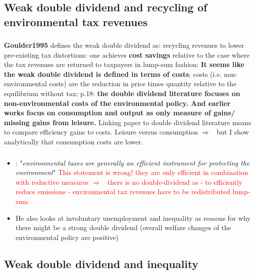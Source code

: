 \documentclass[12pt]{article}
\newcommand{\ar}{$\Rightarrow$ \ }
\newcommand{\tr}[1]{\textcolor{red}{#1}}
\begin{document}
\subsection{Weak double dividend and recycling of environmental tax revenues}
\subsubsection{\cite{Goulder1995EnvironmentalGuide}}
\textbf{Goulder1995} defines the weak double dividend as: recycling revenues to lower pre-existing tax distortions: one achieves \textbf{cost savings} relative to the case where the tax revenues are returned to taxpayers in lump-sum fashion; 
\textbf{It seems like the weak double dividend is defined in terms of costs}; costs (i.e. non-environmental costs) are the reduction in price times quantity relative to the equilibrium without tax; p.18: \textbf{the double dividend literature focuses on non-environmental costs of the environmental policy. And earlier works focus on consumption and output as only measure of gains/ missing gains from leisure. } 
Linking paper to double dividend literature means to compare efficiency gains to costs. Leisure versus consumption \ar but I show analytically that consumption costs are lower. 


\subsubsection{\cite{Fried2018TheGenerations}}
\subsubsection{\cite{LansBovenberg1999GreenGuide}}
\begin{itemize}
	\item 
	\textbf{\cite{LansBovenberg1999GreenGuide}}: "\textit{environmental taxes are  generally  an  efficient  instrument  for  protecting  the  environment}"
	\tr{This statement is wrong! they are only efficient in combination with reductive measures \ar there is no double-dividend as - to efficiently reduce emissions - environmental tax revenues have to be redistributed lump-sum}
	\item 
	He also looks at involuntary unemployment and inequality  as reasons for why there might be a strong double dividend (overall welfare changes of the environmental policy are positive)
\end{itemize}
\subsection{Weak double dividend and inequality}
\end{document}
